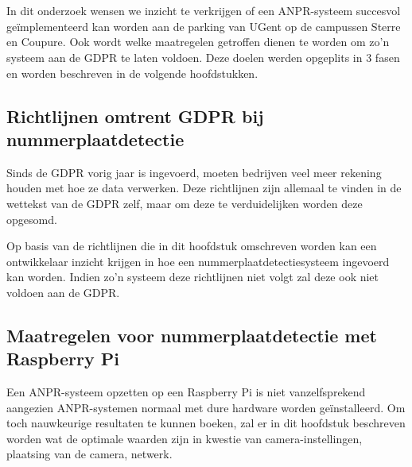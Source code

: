 
\chapter{}
\label{ch:methodologie}


In dit onderzoek wensen we inzicht te verkrijgen of een ANPR-systeem succesvol geïmplementeerd kan worden aan de parking van UGent op de campussen Sterre en Coupure. Ook wordt welke maatregelen getroffen dienen te worden om zo'n systeem aan de GDPR te laten voldoen. Deze doelen werden opgeplits in 3 fasen en worden beschreven in de volgende hoofdstukken.

\section{Richtlijnen omtrent GDPR bij nummerplaatdetectie}
Sinds de GDPR vorig jaar is ingevoerd, moeten bedrijven veel meer rekening houden met hoe ze data verwerken. Deze richtlijnen zijn allemaal te vinden in de wettekst van de GDPR zelf, maar om deze te verduidelijken worden deze opgesomd.

Op basis van de richtlijnen die in dit hoofdstuk omschreven worden kan een ontwikkelaar inzicht krijgen in hoe een nummerplaatdetectiesysteem ingevoerd kan worden. Indien zo'n systeem deze richtlijnen niet volgt zal deze ook niet voldoen aan de GDPR. 

\section{Maatregelen voor nummerplaatdetectie met Raspberry Pi}
Een ANPR-systeem opzetten op een Raspberry Pi is niet vanzelfsprekend aangezien ANPR-systemen normaal met dure hardware worden geïnstalleerd. Om toch nauwkeurige resultaten te kunnen boeken, zal er in dit hoofdstuk beschreven worden wat de optimale waarden zijn in kwestie van camera-instellingen, plaatsing van de camera, netwerk.

